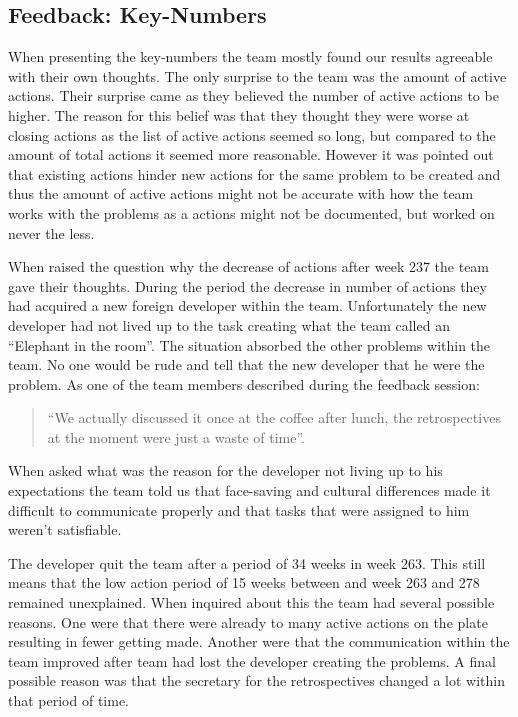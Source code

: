 \subsection{Feedback: Key-Numbers}
When presenting the key-numbers the team mostly found our results agreeable with their own thoughts. The only surprise to the team was the amount of active actions. Their surprise came as they believed the number of active actions to be higher. The reason for this belief was that they thought they were worse at closing actions as the list of active actions seemed so long, but compared to the amount of total actions it seemed more reasonable. However it was pointed out that existing actions hinder new actions for the same problem to be created and thus the amount of active actions might not be accurate with how the team works with the problems as a actions might not be documented, but worked on never the less. 

\label{results-elephant-in-the-room} When raised the question why the decrease of actions after week 237 the team gave their thoughts. During the period the decrease in number of actions they had acquired a new foreign developer within the team. Unfortunately the new developer had not lived up to the task creating what the team called an ``Elephant in the room''. The situation absorbed the other problems within the team. No one would be rude and tell that the new developer that he were the problem. As one of the team members described during the feedback session: 
\begin{quote}
``We actually discussed it once at the coffee after lunch, the retrospectives at the moment were just a waste of time''. 
\end{quote}
When asked what was the reason for the developer not living up to his expectations the team told us that face-saving and cultural differences made it difficult to communicate properly and that tasks that were assigned to him weren't satisfiable. 

The developer quit the team after a period of 34 weeks in week 263. This still means that the low action period of 15 weeks between and week 263 and 278 remained unexplained. When inquired about this the team had several possible reasons. One were that there were already to many active actions on the plate resulting in fewer getting made. Another were that the communication within the team improved after team had lost the developer creating the problems. A final possible reason was that the secretary for the retrospectives changed a lot within that period of time. 

